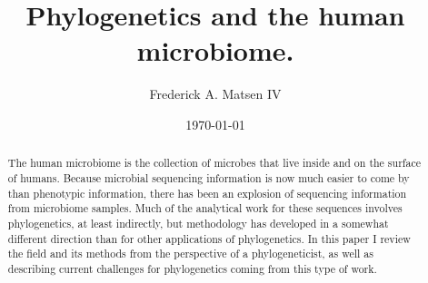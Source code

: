 \documentclass{amsart}
\newcommand{\forarxiv}[1]{#1}
\newcommand{\notforarxiv}[1]{}
\begin{document}
\notforarxiv{
\begin{flushright}
Version dated: \today
\end{flushright}
\bigskip
\noindent RH: PHYLOGENETICS AND THE HUMAN MICROBIOME
\bigskip
\medskip
\begin{center}

\noindent{\Large \bf Phylogenetics and the human microbiome.}
\bigskip

\noindent {\normalsize \sc
Frederick A. Matsen IV$^1$}\\
\noindent {\small \it
$^1$
Program in Computational Biology, Fred Hutchinson Cancer Research Center, Seattle, WA, 91802, USA}\\
\end{center}
\medskip
\noindent{\bf Corresponding author:} Frederick A Matsen, Program in Computational Biology, Fred Hutchinson Cancer Research Center, Seattle, WA, 91802, USA; E-mail: matsen@fhcrc.org.\\
\vspace{1in}
}

\forarxiv{\
\title{Phylogenetics and the human microbiome.}
\author{Frederick A. Matsen IV}
\date{\today}
\begin{abstract}
}
\notforarxiv{
\newpage
\section{Abstract}
}

The human microbiome is the collection of microbes that live inside and on the surface of humans.
Because microbial sequencing information is now much easier to come by than phenotypic information, there has been an explosion of sequencing information from microbiome samples.
Much of the analytical work for these sequences involves phylogenetics, at least indirectly, but methodology has developed in a somewhat different direction than for other applications of phylogenetics.
In this paper I review the field and its methods from the perspective of a phylogeneticist, as well as describing current challenges for phylogenetics coming from this type of work.

\forarxiv{
\end{abstract}
\maketitle
}

\notforarxiv{
\vspace{4.5in}
\noindent (Keywords: human microbiome; microbial ecology; phylogenetic methods; 16S; metagenome)\\
\newpage
}
\end{document}
